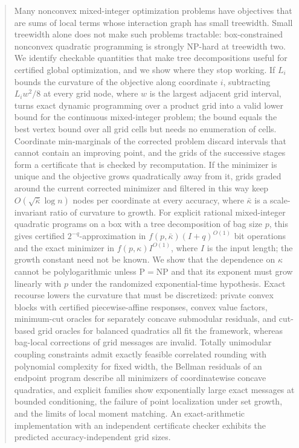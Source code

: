 \begin{abstract}
Many nonconvex mixed-integer optimization problems have objectives that are
sums of local terms whose interaction graph has small treewidth. Small
treewidth alone does not make such problems tractable: box-constrained
nonconvex quadratic programming is strongly NP-hard at treewidth two. We
identify checkable quantities that make tree decompositions useful for
certified global optimization, and we show where they stop working. If $L_i$
bounds the curvature of the objective along coordinate $i$, subtracting
$L_iw^2/8$ at every grid node, where $w$ is the largest adjacent grid interval,
turns exact dynamic programming over a product grid into a valid lower bound
for the continuous mixed-integer problem; the bound equals the best vertex
bound over all grid cells but needs no enumeration of cells. Coordinate
min-marginals of the corrected problem discard intervals that cannot contain
an improving point, and the grids of the successive stages form a certificate
that is checked by recomputation. If the minimizer is unique and the objective
grows quadratically away from it, grids graded around the current corrected
minimizer and filtered in this way keep $O(\sqrt{\bar\kappa}\log n)$ nodes per
coordinate at every accuracy, where $\bar\kappa$ is a scale-invariant ratio of
curvature to growth. For explicit rational mixed-integer quadratic programs on
a box with a tree decomposition of bag size $p$, this gives certified
$2^{-q}$-approximation in $f(p,\bar\kappa)(I+q)^{O(1)}$ bit operations and the
exact minimizer in $f(p,\kappa)I^{O(1)}$, where $I$ is the input length; the
growth constant need not be known. We show that the dependence on $\kappa$
cannot be polylogarithmic unless P${}={}$NP and that its exponent must grow
linearly with $p$ under the randomized exponential-time hypothesis. Exact
recourse lowers the curvature that must be discretized: private convex blocks
with certified piecewise-affine responses, convex value factors, minimum-cut
oracles for separately concave submodular residuals, and cut-based grid
oracles for balanced quadratics all fit the framework, whereas bag-local
corrections of grid messages are invalid. Totally unimodular coupling
constraints admit exactly feasible correlated rounding with polynomial
complexity for fixed width, the Bellman residuals of an endpoint program
describe all minimizers of coordinatewise concave quadratics, and
explicit families show exponentially large exact messages at bounded
conditioning, the failure of point localization under set growth, and the
limits of local moment matching. An exact-arithmetic implementation with an
independent certificate checker exhibits the predicted accuracy-independent
grid sizes.
\end{abstract}
